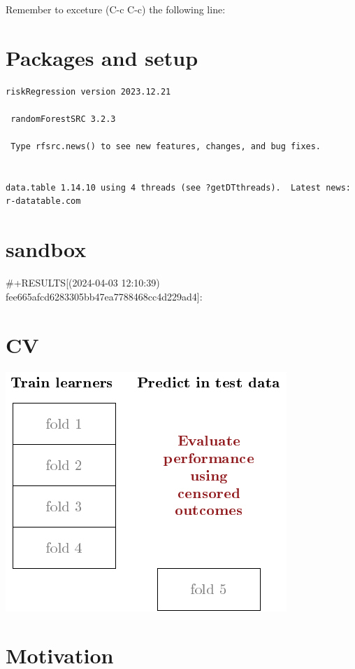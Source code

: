 \documentclass[11pt]{article}
\author{Anders Munch}
\date{\today}
\title{}
\begin{document}
\tableofcontents

Remember to exceture (C-c C-c) the following line:


\section{Packages and setup}
\label{sec:org03ea286}
\begin{verbatim}
riskRegression version 2023.12.21

 randomForestSRC 3.2.3 
 
 Type rfsrc.news() to see new features, changes, and bug fixes. 
 

data.table 1.14.10 using 4 threads (see ?getDTthreads).  Latest news: r-datatable.com
\end{verbatim}


\section{sandbox}
\label{sec:org19b5a97}
\#+RESULTS[(2024-04-03 12:10:39) fee665afcd6283305bb47ea7788468cc4d229ad4]:

\section{CV}
\label{sec:orgc34b6a9}

\begin{center}
\includegraphics[width=.9\linewidth]{cv-viz.pdf}
\end{center}

\section{Motivation}
\label{sec:orge704139}
\end{document}
